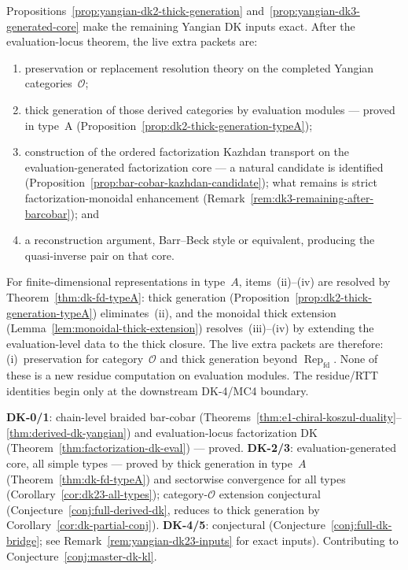 \begin{remark}
\label{rem:yangian-dk23-inputs}
Propositions~\ref{prop:yangian-dk2-thick-generation}
and~\ref{prop:yangian-dk3-generated-core} make the remaining Yangian
DK inputs exact.  After the evaluation-locus theorem, the live extra
packets are:
\begin{enumerate}[label=\textup{(\roman*)}]
\item preservation or replacement resolution theory on the completed
  Yangian categories~$\mathcal{O}$;
\item thick generation of those derived categories by evaluation
  modules --- proved in type~A
  (Proposition~\ref{prop:dk2-thick-generation-typeA});
\item construction of the ordered factorization Kazhdan transport on
  the evaluation-generated factorization core --- a natural candidate
  is identified (Proposition~\ref{prop:bar-cobar-kazhdan-candidate});
  what remains is strict factorization-monoidal enhancement
  (Remark~\ref{rem:dk3-remaining-after-barcobar}); and
\item a reconstruction argument, Barr--Beck style or equivalent,
  producing the quasi-inverse pair on that core.
\end{enumerate}
For finite-dimensional representations in type~$A$,
items~(ii)--(iv) are resolved by
Theorem~\ref{thm:dk-fd-typeA}: thick generation
(Proposition~\ref{prop:dk2-thick-generation-typeA}) eliminates~(ii),
and the monoidal thick extension
(Lemma~\ref{lem:monoidal-thick-extension}) resolves~(iii)--(iv)
by extending the evaluation-level data to the thick closure.
The live extra packets are therefore:
(i)~preservation for category~$\mathcal{O}$ and
thick generation beyond $\operatorname{Rep}_{\mathrm{fd}}$.
None of these is a new residue computation on evaluation modules.  The
residue/RTT identities begin only at the downstream DK-4/MC4 boundary.
\end{remark}

\begin{remark}
\label{rem:dk-proved-vs-remains}
\textbf{DK-0/1}: chain-level braided bar-cobar (Theorems~\ref{thm:e1-chiral-koszul-duality}--\ref{thm:derived-dk-yangian}) and evaluation-locus factorization DK (Theorem~\ref{thm:factorization-dk-eval}) --- proved.  \textbf{DK-2/3}: evaluation-generated core, all simple types --- proved by thick generation in type~$A$ (Theorem~\ref{thm:dk-fd-typeA}) and sectorwise convergence for all types (Corollary~\ref{cor:dk23-all-types}); category-$\mathcal{O}$ extension conjectural (Conjecture~\ref{conj:full-derived-dk}, reduces to thick generation by Corollary~\ref{cor:dk-partial-conj}).  \textbf{DK-4/5}: conjectural (Conjecture~\ref{conj:full-dk-bridge}; see Remark~\ref{rem:yangian-dk23-inputs} for exact inputs).  Contributing to Conjecture~\ref{conj:master-dk-kl}.
\end{remark}

